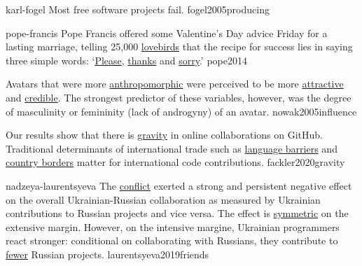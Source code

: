 \documentclass{article}
\begin{document}



\qte
  {karl-fogel}
  {Most free software projects fail.}
  {fogel2005producing}

\qte
  {pope-francis}
  {Pope Francis offered some Valentine’s Day advice Friday for a lasting marriage, telling 25,000 \ul{lovebirds} that the recipe for success lies in saying three simple words: `\ul{Please}, \ul{thanks} and \ul{sorry}.'{}}
  {pope2014}

  {Avatars that were more \ul{anthropomorphic} were perceived to be more \ul{attractive} and \ul{credible}. The strongest predictor of these variables, however, was the degree of masculinity or femininity (lack of androgyny) of an avatar.}
  {nowak2005influence}

  {Our results show that there is \ul{gravity} in online collaborations on GitHub. Traditional determinants of international trade such as \ul{language barriers} and \ul{country borders} matter for international code contributions.}
  {fackler2020gravity}

\qte
  {nadzeya-laurentsyeva}
  {The \ul{conflict} exerted a strong and persistent negative effect on the overall
  Ukrainian-Russian collaboration as measured by Ukrainian contributions
  to Russian projects and vice versa. The effect is \ul{symmetric} on the extensive margin.
  However, on the intensive margine, Ukrainian programmers react stronger: conditional
  on collaborating with Russians, they contribute to \ul{fewer} Russian projects.}
  {laurentsyeva2019friends}
\end{document}
